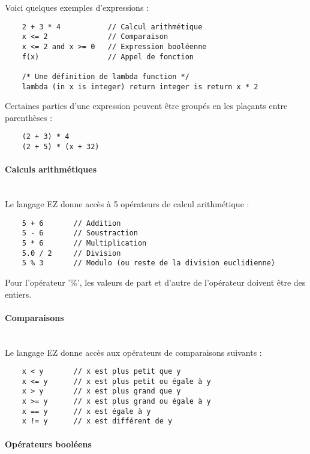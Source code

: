 Voici quelques exemples d'expressions :
\begin{verbatim}
    2 + 3 * 4           // Calcul arithmétique
    x <= 2              // Comparaison
    x <= 2 and x >= 0   // Expression booléenne
    f(x)                // Appel de fonction

    /* Une définition de lambda function */
    lambda (in x is integer) return integer is return x * 2
\end{verbatim}

Certaines parties d'une expression peuvent être groupés en les plaçants
entre parenthèses :
\begin{verbatim}
    (2 + 3) * 4
    (2 + 5) * (x + 32)
\end{verbatim}

\paragraph{Calculs arithmétiques}\mbox{} \\

Le langage EZ donne accès à 5 opérateurs de calcul arithmétique :
\begin{verbatim}
    5 + 6       // Addition
    5 - 6       // Soustraction
    5 * 6       // Multiplication
    5.0 / 2     // Division
    5 % 3       // Modulo (ou reste de la division euclidienne)
\end{verbatim}

Pour l'opérateur '\%', les valeurs de part et d'autre de l'opérateur doivent
être des entiers.

\paragraph{Comparaisons}\mbox{} \\

Le langage EZ donne accès aux opérateurs de comparaisons suivants :
\begin{verbatim}
    x < y       // x est plus petit que y
    x <= y      // x est plus petit ou égale à y
    x > y       // x est plus grand que y
    x >= y      // x est plus grand ou égale à y
    x == y      // x est égale à y
    x != y      // x est différent de y
\end{verbatim}

\paragraph{Opérateurs booléens}\mbox{} \\

